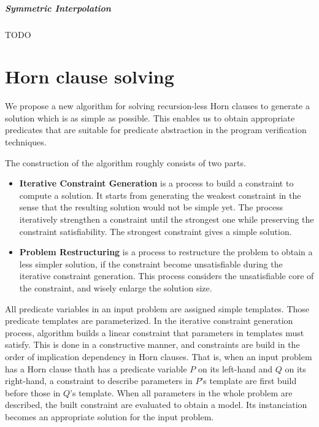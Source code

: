 \documentclass[master,final,12pt]{iscs-thesis}
\begin{document}
\paragraph{Symmetric Interpolation}
TODO


\chapter{Horn clause solving}

We propose a new algorithm for solving recursion-less Horn clauses to
generate a solution which is as simple as possible.  This enables us
to obtain appropriate predicates that are suitable for predicate
abstraction in the program verification techniques.

The construction of the algorithm roughly consists of two parts.
\begin{itemize}
\item \textbf{Iterative Constraint Generation} is a process to build a
  constraint to compute a solution.  It starts from generating the
  weakest constraint in the sense that the resulting solution would
  not be simple yet.  The process iteratively strengthen a constraint
  until the strongest one while preserving the constraint
  satisfiability.  The strongest constraint gives a simple solution.
\item \textbf{Problem Restructuring} is a process to restructure the
  problem to obtain a less simpler solution, if the constraint become
  unsatisfiable during the iterative constraint generation.  This
  process considers the unsatisfiable core of the constraint, and
  wisely enlarge the solution size.
\end{itemize}

All predicate variables in an input problem are assigned simple
templates.  Those predicate templates are parameterized.  In the
iterative constraint generation process, algorithm builds a linear
constraint that parameters in templates must satisfy.  This is done in
a constructive manner, and constraints are build in the order of
implication dependency in Horn clauses.  That is, when an input
problem has a Horn clause thath has a predicate variable $P$ on its
left-hand and $Q$ on its right-hand, a constraint to describe
parameters in $P$'s template are first build before those in $Q$'s
template.  When all parameters in the whole problem are described, the
built constraint are evaluated to obtain a model.  Its instanciation
becomes an appropriate solution for the input problem.
\end{document}
